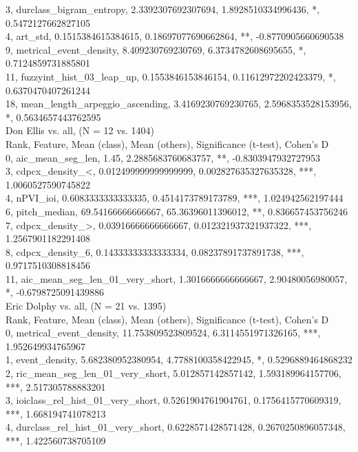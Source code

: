 3, durclass_bigram_entropy, 2.3392307692307694, 1.8928510334996436, *, 0.5472127662827105\\
4, art_std, 0.1515384615384615, 0.18697077690662864, **, -0.8770905660690538\\
9, metrical_event_density, 8.409230769230769, 6.3734782608695655, *, 0.7124859731885801\\
11, fuzzyint_hist_03_leap_up, 0.1553846153846154, 0.11612972202423379, *, 0.6370470407261244\\
18, mean_length_arpeggio_ascending, 3.4169230769230765, 2.5968353528153956, *, 0.5634657443762595\\
Don Ellis vs. all, (N = 12 vs. 1404)\\
Rank, Feature, Mean (class), Mean (others), Significance (t-test), Cohen's D\\
0, aic_mean_seg_len, 1.45, 2.2885683760683757, **, -0.8303947932727953\\
3, cdpcx_density_<, 0.012499999999999999, 0.002827635327635328, ***, 1.0060527590745822\\
4, nPVI_ioi, 0.6083333333333335, 0.4514173789173789, ***, 1.024942562197444\\
6, pitch_median, 69.54166666666667, 65.36396011396012, **, 0.836657453756246\\
7, cdpcx_density_>, 0.03916666666666667, 0.012321937321937322, ***, 1.2567901182291408\\
8, cdpcx_density_6, 0.14333333333333334, 0.08237891737891738, ***, 0.9717510308818456\\
11, aic_mean_seg_len_01_very_short, 1.3016666666666667, 2.90480056980057, *, -0.6798725091439886\\
Eric Dolphy vs. all, (N = 21 vs. 1395)\\
Rank, Feature, Mean (class), Mean (others), Significance (t-test), Cohen's D\\
0, metrical_event_density, 11.753809523809524, 6.3114551971326165, ***, 1.952649934765967\\
1, event_density, 5.682380952380954, 4.7788100358422945, *, 0.5296889464868232\\
2, ric_mean_seg_len_01_very_short, 5.012857142857142, 1.593189964157706, ***, 2.517305788883201\\
3, ioiclass_rel_hist_01_very_short, 0.5261904761904761, 0.1756415770609319, ***, 1.668194741078213\\
4, durclass_rel_hist_01_very_short, 0.6228571428571428, 0.2670250896057348, ***, 1.422560738705109\\
